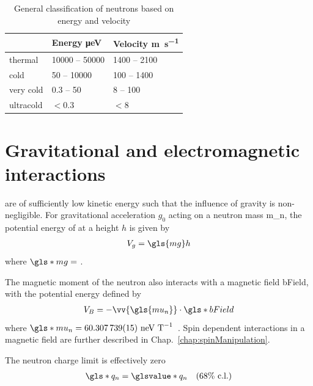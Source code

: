 \begin{table}
\centering
\caption{General classification of neutrons based on energy and velocity}\label{tb:neutron_energy_range}
\begin{tabular}{
    l
    l
    l
}
\toprule
& {Energy \unit{\micro eV}} & {Velocity \unit{m\per s}} \\ 
\midrule
thermal & \num{10000} -- \num{50000} & \num{1400} -- \num{2100} \\
cold & \num{50} -- \num{10000} & \num{100} -- \num{1400} \\
very cold & \num{0.3} -- \num{50} & \num{8} -- \num{100} \\
ultracold & $< \num{0.3}$ & $<8$ \\
\bottomrule
\end{tabular}
\end{table}



\section{Gravitational and electromagnetic interactions}\label{sec:ucn_grav_em}


\ucn are of sufficiently low kinetic energy such that the influence of gravity is non-negligible. For gravitational acceleration $g_0$ acting on a neutron mass \gls{m_n}, the potential energy of at a height $h$ is given by
%
\begin{gather}
    V_g = \gls{mg}h
\end{gather}
%
where $\gls*{mg}=$ \cite{codata_2018}.

The magnetic moment of the neutron also interacts with a magnetic field \gls*{bField}, with the potential energy defined by
%
\begin{gather}
    V_B = - \vv{\gls{mu_n}}\cdot \gls*{bField}
\end{gather}
%
where $\gls*{mu_n}=60.307\,739(15)\text{ neV T}^{-1}$~\cite{codata_2018}. Spin dependent interactions in a magnetic field are further described in Chap.~\ref{chap:spinManipulation}.

The neutron charge limit is effectively zero~\cite{baumann_neutron_charge}
%
\begin{gather}
    \gls*{q_n}=\glsvalue*{q_n}\quad(68 \% \text{ c.l.})
\end{gather}


